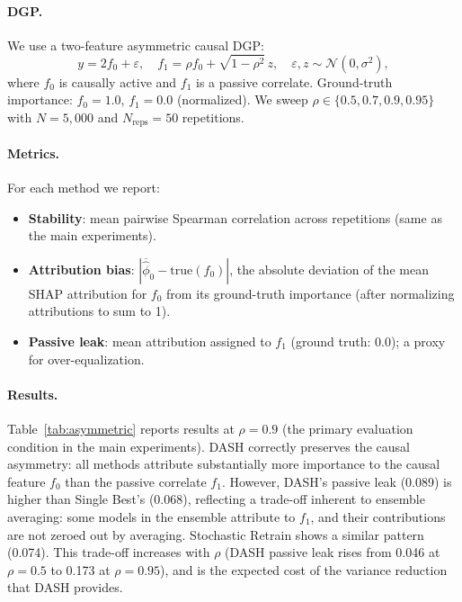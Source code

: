 \documentclass[11pt]{article}
\newcommand{\dash}{\textsc{DASH}}
\begin{document}
\paragraph{DGP.}
We use a two-feature asymmetric causal DGP:
\[
  y = 2 f_0 + \varepsilon, \quad
  f_1 = \rho f_0 + \sqrt{1 - \rho^2}\, z, \quad
  \varepsilon, z \sim \mathcal{N}(0, \sigma^2),
\]
where $f_0$ is causally active and $f_1$ is a passive correlate.
Ground-truth importance: $f_0 = 1.0$, $f_1 = 0.0$ (normalized).
We sweep $\rho \in \{0.5, 0.7, 0.9, 0.95\}$ with $N = 5{,}000$ and
$N_{\text{reps}} = 50$ repetitions.

\paragraph{Metrics.}
For each method we report:
\begin{itemize}
  \item \textbf{Stability}: mean pairwise Spearman correlation across
    repetitions (same as the main experiments).
  \item \textbf{Attribution bias}: $|\overline{\hat{\phi}}_0 - \text{true}(f_0)|$,
    the absolute deviation of the mean SHAP attribution for $f_0$ from its
    ground-truth importance (after normalizing attributions to sum to 1).
  \item \textbf{Passive leak}: mean attribution assigned to $f_1$
    (ground truth: 0.0); a proxy for over-equalization.
\end{itemize}

\paragraph{Results.}
Table~\ref{tab:asymmetric} reports results at $\rho = 0.9$ (the
primary evaluation condition in the main experiments).
\dash{} correctly preserves the causal asymmetry: all methods attribute
substantially more importance to the causal feature $f_0$ than the
passive correlate $f_1$. However, \dash{}'s passive leak (0.089) is
higher than Single Best's (0.068), reflecting a trade-off inherent to
ensemble averaging: some models in the ensemble attribute to $f_1$, and
their contributions are not zeroed out by averaging. Stochastic Retrain
shows a similar pattern (0.074). This trade-off increases with $\rho$
(DASH passive leak rises from 0.046 at $\rho{=}0.5$ to 0.173 at
$\rho{=}0.95$), and is the expected cost of the variance reduction
that \dash{} provides.
\end{document}
